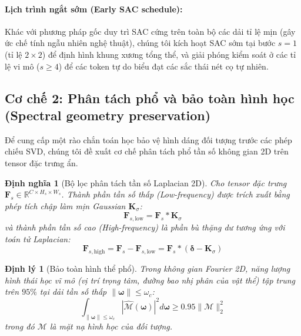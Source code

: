 \documentclass[10pt,twocolumn,letterpaper]{article}
\newtheorem{theorem}{Định lý}
\newtheorem{definition}{Định nghĩa}
\begin{document}
\paragraph{Lịch trình ngắt sớm (Early SAC schedule):}
Khác với phương pháp gốc duy trì SAC cứng trên toàn bộ các dải tỉ lệ mịn (gây ức chế tính ngẫu nhiên nghệ thuật), chúng tôi kích hoạt SAC sớm tại bước $s=1$ (tỉ lệ $2 \times 2$) để định hình khung xương tổng thể, và giải phóng kiểm soát ở các tỉ lệ vi mô ($s \ge 4$) để các token tự do biểu đạt các sắc thái nét cọ tự nhiên.

\subsection{Cơ chế 2: Phân tách phổ và bảo toàn hình học (Spectral geometry preservation)}
\label{subsec:spectral}

Để cung cấp một rào chắn toán học bảo vệ hình dáng đối tượng trước các phép chiếu SVD, chúng tôi đề xuất cơ chế phân tách phổ tần số không gian 2D trên tensor đặc trưng ẩn.

\begin{definition}[Bộ lọc phân tách tần số Laplacian 2D]
Cho tensor đặc trưng $\mathbf{F}_s \in \mathbb{R}^{C \times H_s \times W_s}$. Thành phần tần số thấp (Low-frequency) được trích xuất bằng phép tích chập làm mịn Gaussian $\mathbf{K}_{\sigma}$:
\begin{equation}
\mathbf{F}_{s, \text{low}} = \mathbf{F}_s * \mathbf{K}_{\sigma}
\end{equation}
và thành phần tần số cao (High-frequency) là phần bù thặng dư tương ứng với toán tử Laplacian:
\begin{equation}
\mathbf{F}_{s, \text{high}} = \mathbf{F}_s - \mathbf{F}_{s, \text{low}} = \mathbf{F}_s * (\boldsymbol{\delta} - \mathbf{K}_{\sigma})
\end{equation}
\end{definition}

\begin{theorem}[Bảo toàn hình thể phổ]
\label{thm:spectral_energy}
Trong không gian Fourier 2D, năng lượng hình thái học vĩ mô (vị trí trọng tâm, đường bao nhị phân của vật thể) tập trung trên $95\%$ tại dải tần số thấp $\|\boldsymbol{\omega}\| \le \omega_c$:
\begin{equation}
\int_{\|\boldsymbol{\omega}\| \le \omega_c} |\widehat{\mathcal{M}}(\boldsymbol{\omega})|^2 d\boldsymbol{\omega} \ge 0.95 \|\mathcal{M}\|_2^2
\end{equation}
trong đó $\mathcal{M}$ là mặt nạ hình học của đối tượng.
\end{theorem}
\end{document}

